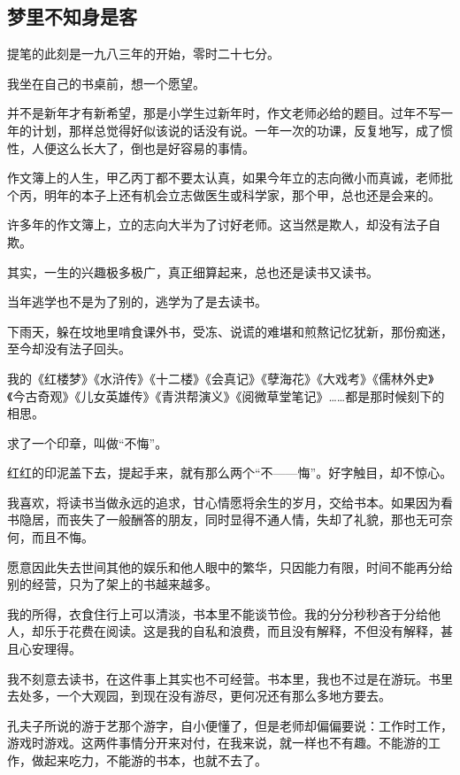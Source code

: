 \subsection{梦里不知身是客}

\par 提笔的此刻是一九八三年的开始，零时二十七分。
\par 我坐在自己的书桌前，想一个愿望。
\par 并不是新年才有新希望，那是小学生过新年时，作文老师必给的题目。过年不写一年的计划，那样总觉得好似该说的话没有说。一年一次的功课，反复地写，成了惯性，人便这么长大了，倒也是好容易的事情。
\par 作文簿上的人生，甲乙丙丁都不要太认真，如果今年立的志向微小而真诚，老师批个丙，明年的本子上还有机会立志做医生或科学家，那个甲，总也还是会来的。
\par 许多年的作文簿上，立的志向大半为了讨好老师。这当然是欺人，却没有法子自欺。
\par 其实，一生的兴趣极多极广，真正细算起来，总也还是读书又读书。
\par 当年逃学也不是为了别的，逃学为了是去读书。
\par 下雨天，躲在坟地里啃食课外书，受冻、说谎的难堪和煎熬记忆犹新，那份痴迷，至今却没有法子回头。
\par 我的《红楼梦》《水浒传》《十二楼》《会真记》《孽海花》《大戏考》《儒林外史》《今古奇观》《儿女英雄传》《青洪帮演义》《阅微草堂笔记》……都是那时候刻下的相思。
\par 求了一个印章，叫做“不悔”。
\par 红红的印泥盖下去，提起手来，就有那么两个“不——悔”。好字触目，却不惊心。
\par 我喜欢，将读书当做永远的追求，甘心情愿将余生的岁月，交给书本。如果因为看书隐居，而丧失了一般酬答的朋友，同时显得不通人情，失却了礼貌，那也无可奈何，而且不悔。
\par 愿意因此失去世间其他的娱乐和他人眼中的繁华，只因能力有限，时间不能再分给别的经营，只为了架上的书越来越多。
\par 我的所得，衣食住行上可以清淡，书本里不能谈节俭。我的分分秒秒吝于分给他人，却乐于花费在阅读。这是我的自私和浪费，而且没有解释，不但没有解释，甚且心安理得。
\par 我不刻意去读书，在这件事上其实也不可经营。书本里，我也不过是在游玩。书里去处多，一个大观园，到现在没有游尽，更何况还有那么多地方要去。
\par 孔夫子所说的游于艺那个游字，自小便懂了，但是老师却偏偏要说：工作时工作，游戏时游戏。这两件事情分开来对付，在我来说，就一样也不有趣。不能游的工作，做起来吃力，不能游的书本，也就不去了。
